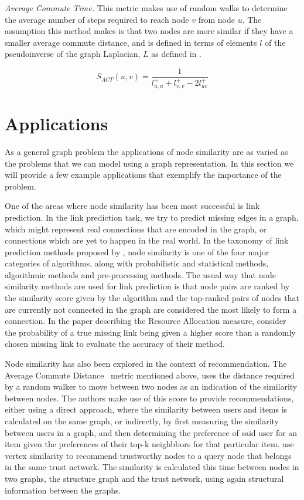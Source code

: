\emph{Average Commute Time.} This metric makes use of random walks to determine
the average number of steps required to reach node $v$ from node $u$. The assumption
this method makes is that two nodes are more similar if they have a smaller average
commute distance, and is defined in terms of elements $l$ of the pseudoinverse of the
graph Laplacian, $L$ as defined in \cite{link-prediction-survey}.

\begin{equation}
	S_{ACT}(u, v)=\frac{1}{l_{u, u}^{+}+l_{v, v}^{+}-2 l_{uv}^{+}}
\end{equation}


\section{Applications}

As a general graph problem the applications of node similarity are as varied
as the problems that we can model using a graph representation. In this
section we will provide a few example applications that exemplify the importance
of the problem.

One of the areas where node similarity has been most successful is link
prediction. In the link prediction task, we try to predict missing
edges in a graph, which might represent real connections that are encoded
in the graph, or connections which are yet to happen in the real world.
In the taxonomy of link prediction methods proposed by
\citet{link-prediction-survey-2017}, node similarity is one of the
four major categories of algorithms, along with probabilistic and
statistical methods, algorithmic methods and pre-processing methods.
The usual way that node similarity methods are used for link prediction
is that node pairs are ranked by the similarity score given by the
algorithm and the top-ranked pairs of nodes that are currently not connected
in the graph are considered the most likely to form a connection.
In the paper describing the Resource Allocation measure, \citet{resource-allocation-sim}
consider the probability of a true missing link
being given a higher score than a randomly chosen missing link
to evaluate the accuracy of their method.


Node similarity has also been explored in the context of recommendation.
The Average Commute Distance~\cite{average-commute-distance} metric mentioned above, uses the distance
required by a random walker to move between two nodes as an indication
of the similarity between nodes. The authors make use of this score
to provide recommendations, either using a direct approach, where
the similarity between users and items is calculated on the same
graph, or indirectly, by first measuring the similarity between
users in a graph, and then determining the preference of said
user for an item given the preferences of their top-k neighbbors
for that particular item.
\citet{trust-similarity} use vertex similarity to recommend trustworthy
nodes to a query node that belongs in the same trust network.
The similarity is calculated this time between
nodes in two graphs, the structure graph and the trust network,
using again structural information between the graphs.

